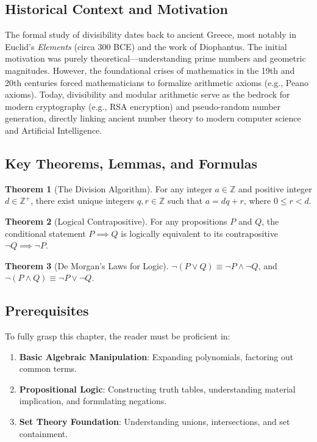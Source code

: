 \documentclass[11pt]{article}
\theoremstyle{definition}
\newtheorem{theorem}{Theorem}[section]
\theoremstyle{remark}
\begin{document}
\subsection{Historical Context and Motivation}
The formal study of divisibility dates back to ancient Greece, most notably in Euclid's \textit{Elements} (circa 300 BCE) and the work of Diophantus. The initial motivation was purely theoretical—understanding prime numbers and geometric magnitudes. However, the foundational crises of mathematics in the 19th and 20th centuries forced mathematicians to formalize arithmetic axioms (e.g., Peano axioms). Today, divisibility and modular arithmetic serve as the bedrock for modern cryptography (e.g., RSA encryption) and pseudo-random number generation, directly linking ancient number theory to modern computer science and Artificial Intelligence.

\subsection{Key Theorems, Lemmas, and Formulas}
\begin{theorem}[The Division Algorithm]
For any integer $a \in \mathbb{Z}$ and positive integer $d \in \mathbb{Z}^+$, there exist unique integers $q, r \in \mathbb{Z}$ such that $a = dq + r$, where $0 \leq r < d$.
\end{theorem}

\begin{theorem}[Logical Contrapositive]
For any propositions $P$ and $Q$, the conditional statement $P \implies Q$ is logically equivalent to its contrapositive $\neg Q \implies \neg P$.
\end{theorem}

\begin{theorem}[De Morgan's Laws for Logic]
$\neg (P \lor Q) \equiv \neg P \land \neg Q$, and $\neg (P \land Q) \equiv \neg P \lor \neg Q$.
\end{theorem}

\subsection{Prerequisites}
To fully grasp this chapter, the reader must be proficient in:
\begin{enumerate}
    \item \textbf{Basic Algebraic Manipulation}: Expanding polynomials, factoring out common terms.
    \item \textbf{Propositional Logic}: Constructing truth tables, understanding material implication, and formulating negations.
    \item \textbf{Set Theory Foundation}: Understanding unions, intersections, and set containment.
\end{enumerate}
\end{document}

